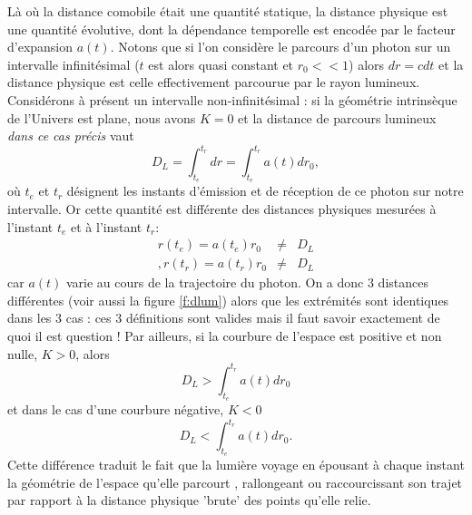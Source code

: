 Là où la distance comobile était une quantité statique, la distance physique est une quantité évolutive, dont la dépendance temporelle est encodée par le facteur d'expansion $a(t)$. Notons que si l'on considère le parcours d'un photon sur un intervalle infinitésimal ($t$ est alors quasi constant et $r_0<<1$) alors $dr=cdt$ et la distance physique est celle effectivement parcourue par le rayon lumineux. Considérons à présent un intervalle non-infinitésimal : si la géométrie intrinsèque de l'Univers est plane, nous avons $K=0$ et la distance de parcours lumineux  \textit{dans ce cas précis} vaut 
\begin{equation}
D_L=\int_{t_e}^{t_r} dr=\int_{t_e}^{t_r}a(t)dr_0,
\end{equation}
où $t_e$ et $t_r$ désignent les instants d'émission et de réception de ce photon sur notre intervalle. Or cette quantité est différente des distances physiques mesurées à l'instant $t_e$ et à l'instant $t_r$:
\begin{eqnarray}
r(t_e)=a(t_e)r_0 &\ne & D_L\\,
r(t_r)=a(t_r)r_0  &\ne & D_L
\end{eqnarray}
car $a(t)$ varie au cours de la trajectoire du photon. On a donc 3 distances différentes (voir aussi la figure \ref{f:dlum}) alors que les extrémités sont identiques dans les 3 cas : ces 3 définitions sont valides mais il faut savoir exactement de quoi il est question  ! Par ailleurs, si la courbure de l'espace est positive et non nulle, $K>0$, alors 
\begin{equation}
 D_L>\int_{t_e}^{t_r} a(t)dr_0
\end{equation}
et dans le cas d'une courbure négative, $K<0$
\begin{equation}
D_L<\int_{t_e}^{t_r} a(t)dr_0.
\end{equation}
Cette différence traduit le fait que la lumière voyage en épousant à chaque instant la géométrie de l'espace qu'elle parcourt , rallongeant ou raccourcissant son trajet par rapport à la distance physique 'brute' des points qu'elle relie. 

